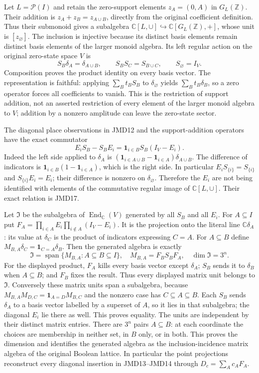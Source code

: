 \documentclass[11pt]{article}
\begin{document}
Let $L=\mathcal P(I)$ and retain the zero-support elements
$z_A=(0,A)$ in $G_L(\mathbb Z)$.
Their addition is $z_A+z_B=z_{A\cup B}$, directly from the original
coefficient definition. Thus their submonoid gives a subalgebra
$\mathbb C[L,\cup]\hookrightarrow\mathbb C[G_L(\mathbb Z),+]$,
whose unit is $[z_\varnothing]$.
The inclusion is injective because its distinct basis elements remain
distinct basis elements of the larger monoid algebra.
Its left regular action on the original zero-state space $V$ is
\[
S_B\delta_A=\delta_{A\cup B},\qquad
S_BS_C=S_{B\cup C},\qquad S_\varnothing=I_V.
\tag{JMD16}
\]
Composition proves the product identity on every basis vector.
The representation is faithful: applying $\sum_Bt_BS_B$ to
$\delta_\varnothing$ yields $\sum_Bt_B\delta_B$, so a zero operator
forces all coefficients to vanish.
This is the restriction of support addition, not an asserted
restriction of every element of the larger monoid algebra to $V$;
addition by a nonzero amplitude can leave the zero-state sector.

The diagonal place observations in JMD12 and the support-addition
operators have the exact commutator
\[
\boxed{
E_iS_B-S_BE_i=\mathbf1_{i\in B}S_B(I_V-E_i).}
\tag{JMD17}
\]
Indeed the left side applied to $\delta_A$ is
$(\mathbf1_{i\in A\cup B}-\mathbf1_{i\in A})\delta_{A\cup B}$.
The difference of indicators is
$\mathbf1_{i\in B}(1-\mathbf1_{i\in A})$, which is the right side.
In particular $E_iS_{\{i\}}=S_{\{i\}}$ and
$S_{\{i\}}E_i=E_i$; their difference is nonzero on
$\delta_\varnothing$.
Therefore the $E_i$ are not being identified with elements of the
commutative regular image of $\mathbb C[L,\cup]$.
Their exact relation is JMD17.

Let $\mathfrak I$ be the subalgebra of $\operatorname{End}_{\mathbb C}(V)$
generated by all $S_B$ and all $E_i$.
For $A\subseteq I$ put
$F_A=\prod_{i\in A}E_i\prod_{i\notin A}(I_V-E_i)$.
It is the projection onto the literal line $\mathbb C\delta_A$:
its value at $\delta_C$ is the product of indicators expressing $C=A$.
For $A\subseteq B$ define $M_{B,A}\delta_C=
\mathbf1_{C=A}\delta_B$.
Then the generated algebra is exactly
\[
\boxed{
\mathfrak I=\operatorname{span}\{M_{B,A}:A\subseteq B\subseteq I\},
\quad M_{B,A}=F_BS_BF_A,\quad\dim\mathfrak I=3^n.}
\tag{JMD18}
\]
For the displayed product, $F_A$ kills every basis vector except
$\delta_A$; $S_B$ sends it to $\delta_B$ when $A\subseteq B$;
and $F_B$ fixes the result. Thus every displayed matrix unit belongs
to $\mathfrak I$.
Conversely these matrix units span a subalgebra, because
$M_{B,A}M_{D,C}=\mathbf1_{A=D}M_{B,C}$ and the nonzero case has
$C\subseteq A\subseteq B$.
Each $S_B$ sends $\delta_A$ to a basis vector labelled by a superset
of $A$, so it lies in that subalgebra; the diagonal $E_i$ lie there
as well. This proves equality.
The units are independent by their distinct matrix entries.
There are $3^n$ pairs $A\subseteq B$: at each coordinate the choices
are membership in neither set, in $B$ only, or in both.
This proves the dimension and identifies the generated algebra as
the inclusion-incidence matrix algebra of the original Boolean lattice.
In particular the point projections reconstruct every diagonal
insertion in JMD13--JMD14 through $D_c=\sum_Ac_AF_A$.
\end{document}
